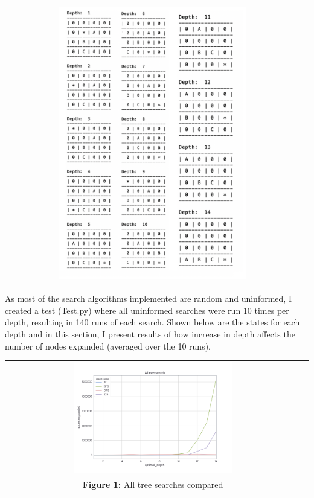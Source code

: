 \documentclass[10pt]{article}
\begin{document}
  \begin{center}
    \begin{tabular}{cc}
    \includegraphics[width=0.65\textwidth]{images/depths.png} \\
      \end{tabular}
    \end{center}

  As most of the search algorithms implemented are random and uninformed, I created a test (Test.py) where all uninformed searches were run 10 times per depth, resulting in 140 runs of each search. Shown below are the states for each depth and in this section, I present results of how increase in depth affects the number of nodes expanded (averaged over the 10 runs). 

  \begin{center}
    \begin{tabular}{cc}
    \includegraphics[width=0.55\textwidth]{images/all_tree.png} \\
    \textbf{Figure 1: } All tree searches compared \\
     \end{tabular}
    \end{center}
  
\end{document}
